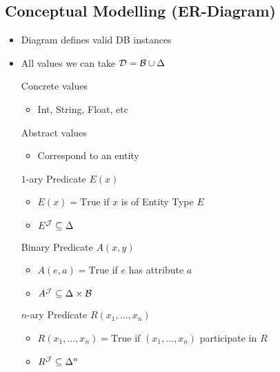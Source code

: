 \subsection{Conceptual Modelling (ER-Diagram)}
\begin{itemize}
        \begin{itemize}
            \item Diagram defines valid DB instances
            \item All values we can take $\mathcal{D} = \mathcal{B} \cup \Delta$
                \begin{itemize}
                     Concrete values
                        \begin{itemize}
                            \item Int, String, Float, etc
                        \end{itemize}
                    \ides{$\mathbf{\Delta}$:} Abstract values
                        \begin{itemize}
                            \item Correspond to an entity
                        \end{itemize}
                \end{itemize}
             $1$-ary Predicate $E(x)$
                \begin{itemize}
                    \item $E(x) = \text{True}$ if $x$ is of Entity Type $E$
                    \item $E^\mathcal{J} \subseteq \Delta$
                \end{itemize}
             Binary Predicate $A(x, y)$
                \begin{itemize}
                    \item $A(e, a) = \text{True}$ if $e$ has attribute $a$
                    \item $A^\mathcal{J} \subseteq \Delta \times \mathcal{B}$
                \end{itemize}
             $n$-ary Predicate $R(x_1, \dots, x_n)$
                \begin{itemize}
                    \item $R(x_1, \dots, x_n) = \text{True}$ if $(x_1, \dots, x_n)$ participate in $R$
                    \item $R^\mathcal{J} \subseteq \Delta^n$
                \end{itemize}

\end{itemize}
\end{itemize}
